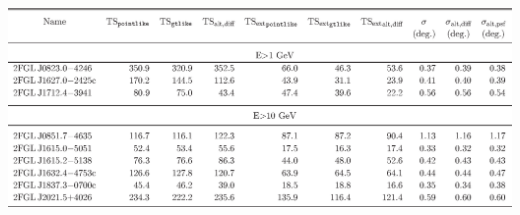 \documentclass[12pt]{beamer}
\begin{document}
\begin{frame}
  \begin{center}
    \includegraphics[scale=0.5]{tables/table5.eps}
  \end{center}
\end{frame}
\end{document}
